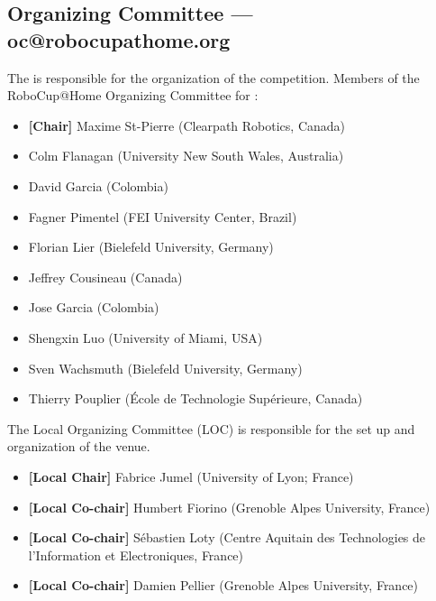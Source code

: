 \subsection{Organizing Committee --- oc@robocupathome.org}
\label{sec:oc}
The  is responsible for the organization of the competition. Members of the RoboCup@Home Organizing Committee for \YEAR:

\begin{itemize}
	\item \textbf{[Chair]} Maxime St-Pierre (Clearpath Robotics, Canada)
	\item Colm Flanagan (University New South Wales, Australia)
	\item David Garcia (Colombia)
	\item Fagner Pimentel (FEI University Center, Brazil)
	\item Florian Lier (Bielefeld University, Germany)
	\item Jeffrey Cousineau (Canada)
	\item Jose Garcia (Colombia)
	\item Shengxin Luo (University of Miami, USA)
	\item Sven Wachsmuth (Bielefeld University, Germany)
	\item Thierry Pouplier (École de Technologie Supérieure, Canada)
\end{itemize}

The Local Organizing Committee (LOC) is responsible for the set up and organization of the venue.
\begin{itemize}
	\item \textbf{[Local Chair]} Fabrice Jumel (University of Lyon; France)
    \item \textbf{[Local Co-chair]} Humbert Fiorino (Grenoble Alpes University, France)
    \item \textbf{[Local Co-chair]} Sébastien Loty (Centre Aquitain des Technologies de l’Information et Electroniques, France)
    \item \textbf{[Local Co-chair]} Damien Pellier (Grenoble Alpes University, France)
\end{itemize}

